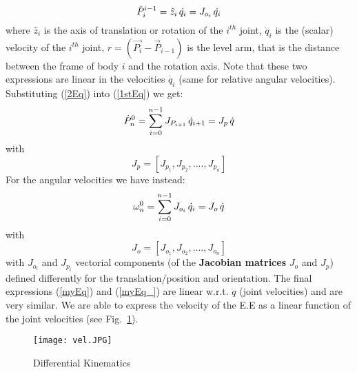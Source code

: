                     \begin{equation}{\label{3Eq}}
                        \dot{P}^{i-1}_{i} = \hat{z}_i \, \dot{q_i} = J_{o_{i}} \, \dot{q_i} 
                    \end{equation}
                    where $\hat{z}_i$ is the axis of translation or rotation of the $i^{th}$ joint, $\dot{q}_i$ is the (scalar) velocity of the $i^{th}$ joint, 
                    $r = (\vec{P_i} - {\vec{P}}_{i-1})$ is the level arm, that is the distance between the frame of body $i$ and the rotation axis.
                    Note that these two expressions are linear in the velocities $\dot{q_i}$ (same for relative angular velocities).                    
%                    
                    Substituting (\ref{2Eq}) into (\ref{1stEq}) we get:
                    \begin{equation}{\label{myEq}}
                        \dot{P}^{0}_{n} = \sum_{i = 0}^{n-1}J_{P_{i+1}} \, {\dot{q}}_{i+1} = J_p \, \dot{q}
                    \end{equation}
                    with 
                    \begin{equation}
                        J_p = [J_{p_1}, J_{p_2}, ...., J_{p_n}] 
                    \end{equation}
%                    
                    For the angular velocities we have instead:
                    \begin{equation}{\label{myEq_}}
                        {\omega}^{0}_{n} = \sum_{i = 0}^{n-1}J_{o_i} \, {\dot{q}}_i = J_o \, \dot{q}
                    \end{equation}
                    with 
                    \begin{equation}
                        J_o = [J_{o_1}, J_{o_2}, ...., J_{o_n}] 
                    \end{equation} 
                    with $J_{o_i}$ and $J_{p_i}$ vectorial components (of the \textbf{Jacobian matrices} $J_o$ and $J_p$) defined differently for the translation/position and orientation.
%                    
                    The final expressions (\ref{myEq}) and (\ref{myEq_}) are linear w.r.t. $\dot{q}$ (joint velocities) and are very similar.                    
                    We are able to express the velocity of the E.E as a linear function of the joint velocities (see Fig.~\ref{ref:differential_kin}).
%                    
                    \begin{figure}[htp]    
                    	\centering
                        \texttt{[image: vel.JPG]}
                        \caption{Differential Kinematics}
                        \label{ref:differential_kin}
                    \end{figure}
                    
